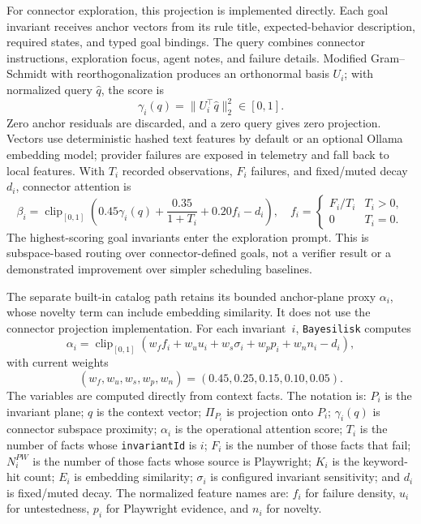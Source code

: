\documentclass[10pt]{article}
\newcommand{\tool}{\texttt{Bayesilisk}\xspace}
\begin{document}
For connector exploration, this projection is implemented directly. Each goal
invariant receives anchor vectors from its rule title, expected-behavior
description, required states, and typed goal bindings. The query combines
connector instructions, exploration focus, agent notes, and failure details.
Modified Gram--Schmidt with reorthogonalization produces an orthonormal basis
\(U_i\); with normalized query \(\widehat q\), the score is
\[
  \gamma_i(q)=\|U_i^\top\widehat q\|_2^2\in[0,1].
\]
Zero anchor residuals are discarded, and a zero query gives zero projection.
Vectors use deterministic
hashed text features by default or an optional Ollama embedding model; provider
failures are exposed in telemetry and fall back to local features. With
\(T_i\) recorded observations, \(F_i\) failures, and fixed/muted decay \(d_i\),
connector attention is
\[
  \beta_i=\operatorname{clip}_{[0,1]}
  \left(0.45\gamma_i(q)+\frac{0.35}{1+T_i}+0.20 f_i-d_i\right),
  \quad
  f_i=\begin{cases}F_i/T_i&T_i>0,\\0&T_i=0.\end{cases}
\]
The highest-scoring goal invariants enter the exploration prompt. This is
subspace-based routing over connector-defined goals, not a verifier result or
a demonstrated improvement over simpler scheduling baselines.

The separate built-in catalog path retains its bounded anchor-plane proxy
\(\alpha_i\), whose novelty term can include embedding similarity. It does not
use the connector projection implementation. For each invariant~\(i\), \tool computes
\[
  \alpha_i =
  \operatorname{clip}_{[0,1]}
  \left(
      w_f f_i + w_u u_i + w_s \sigma_i + w_p p_i + w_n n_i - d_i
  \right),
\]
with current weights
\[
  (w_f,w_u,w_s,w_p,w_n)=(0.45,0.25,0.15,0.10,0.05).
\]
The variables are computed directly from context facts. The notation is:
\(P_i\) is the invariant plane; \(q\) is the context vector; \(\Pi_{P_i}\) is
projection onto \(P_i\); \(\gamma_i(q)\) is connector subspace proximity;
\(\alpha_i\) is the operational attention score; \(T_i\) is the number of facts
whose \texttt{invariantId} is \(i\); \(F_i\) is the number of those facts that
fail; \(N_i^{PW}\) is the number of those facts whose source is
Playwright; \(K_i\) is the keyword-hit count; \(E_i\) is
embedding similarity; \(\sigma_i\) is configured invariant sensitivity; and
\(d_i\) is fixed/muted decay. The normalized feature names are: \(f_i\) for
failure density, \(u_i\) for untestedness, \(p_i\) for Playwright evidence, and
\(n_i\) for novelty.
\end{document}
